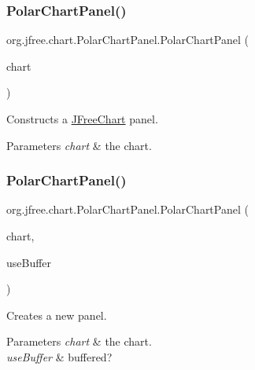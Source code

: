 \subsubsection{\texorpdfstring{Polar\+Chart\+Panel()}{PolarChartPanel()}\hspace{0.1cm}{\footnotesize\ttfamily [1/2]}}
{\footnotesize\ttfamily org.\+jfree.\+chart.\+Polar\+Chart\+Panel.\+Polar\+Chart\+Panel (\begin{DoxyParamCaption}\item[{\mbox{\hyperlink{classorg_1_1jfree_1_1chart_1_1_j_free_chart}{J\+Free\+Chart}}}]{chart }\end{DoxyParamCaption})}

Constructs a \mbox{\hyperlink{classorg_1_1jfree_1_1chart_1_1_j_free_chart}{J\+Free\+Chart}} panel.


\begin{DoxyParams}{Parameters}
{\em chart} & the chart. \\
\hline
\end{DoxyParams}
\mbox{\label{classorg_1_1jfree_1_1chart_1_1_polar_chart_panel_ace2ecd3fcbe1db16de9c22dd604b7bc4}} 
\subsubsection{\texorpdfstring{Polar\+Chart\+Panel()}{PolarChartPanel()}\hspace{0.1cm}{\footnotesize\ttfamily [2/2]}}
{\footnotesize\ttfamily org.\+jfree.\+chart.\+Polar\+Chart\+Panel.\+Polar\+Chart\+Panel (\begin{DoxyParamCaption}\item[{\mbox{\hyperlink{classorg_1_1jfree_1_1chart_1_1_j_free_chart}{J\+Free\+Chart}}}]{chart,  }\item[{boolean}]{use\+Buffer }\end{DoxyParamCaption})}

Creates a new panel.


\begin{DoxyParams}{Parameters}
{\em chart} & the chart. \\
\hline
{\em use\+Buffer} & buffered? \\
\hline
\end{DoxyParams}


